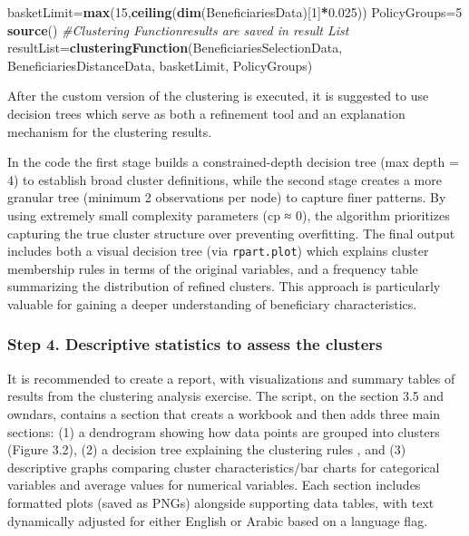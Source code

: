 \documentclass[
]{article}
\newenvironment{Shaded}{\begin{snugshade}}{\end{snugshade}}
\newcommand{\CommentTok}[1]{\textcolor[rgb]{0.56,0.35,0.01}{\textit{#1}}}
\newcommand{\DecValTok}[1]{\textcolor[rgb]{0.00,0.00,0.81}{#1}}
\newcommand{\FloatTok}[1]{\textcolor[rgb]{0.00,0.00,0.81}{#1}}
\newcommand{\FunctionTok}[1]{\textcolor[rgb]{0.13,0.29,0.53}{\textbf{#1}}}
\newcommand{\NormalTok}[1]{#1}
\newcommand{\OtherTok}[1]{\textcolor[rgb]{0.56,0.35,0.01}{#1}}
\newcommand{\SpecialCharTok}[1]{\textcolor[rgb]{0.81,0.36,0.00}{\textbf{#1}}}
\begin{document}
\begin{Shaded}
\begin{Highlighting}[]
\NormalTok{ basketLimit}\OtherTok{=}\FunctionTok{max}\NormalTok{(}\DecValTok{15}\NormalTok{,}\FunctionTok{ceiling}\NormalTok{(}\FunctionTok{dim}\NormalTok{(BeneficiariesData)[}\DecValTok{1}\NormalTok{]}\SpecialCharTok{*}\FloatTok{0.025}\NormalTok{)) }
\NormalTok{ PolicyGroups}\OtherTok{=}\DecValTok{5} 
 \FunctionTok{source}\NormalTok{() }\CommentTok{\#Clustering Function\textquotesingle{}results are saved in  result List }
\NormalTok{ resultList}\OtherTok{=}\FunctionTok{clusteringFunction}\NormalTok{(BeneficiariesSelectionData, BeneficiariesDistanceData, basketLimit, PolicyGroups)}
\end{Highlighting}
\end{Shaded}

After the custom version of the clustering is executed, it is suggested
to use decision trees which serve as both a refinement tool and an
explanation mechanism for the clustering results.

In the code the first stage builds a constrained-depth decision tree
(max depth = 4) to establish broad cluster definitions, while the second
stage creates a more granular tree (minimum 2 observations per node) to
capture finer patterns. By using extremely small complexity parameters
(cp ≈ 0), the algorithm prioritizes capturing the true cluster structure
over preventing overfitting. The final output includes both a visual
decision tree (via \texttt{rpart.plot}) which explains cluster
membership rules in terms of the original variables, and a frequency
table summarizing the distribution of refined clusters. This approach is
particularly valuable for gaining a deeper understanding of beneficiary
characteristics.

\subsubsection{Step 4. Descriptive statistics to assess the
clusters}\label{step-4.-descriptive-statistics-to-assess-the-clusters}

It is recommended to create a report, with visualizations and summary
tables of results from the clustering analysis exercise. The script, on
the section 3.5 and owndars, contains a section that creats a workbook
and then adds three main sections: (1) a dendrogram showing how data
points are grouped into clusters (Figure 3.2), (2) a decision tree
explaining the clustering rules , and (3) descriptive graphs comparing
cluster characteristics/bar charts for categorical variables and average
values for numerical variables. Each section includes formatted plots
(saved as PNGs) alongside supporting data tables, with text dynamically
adjusted for either English or Arabic based on a language flag.
\end{document}
